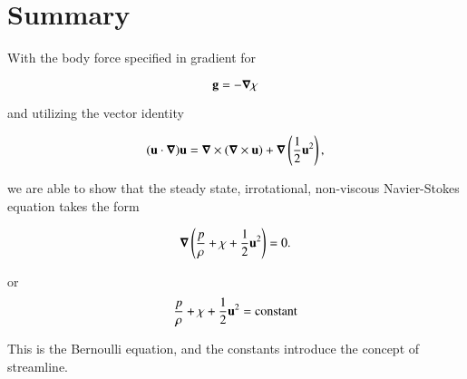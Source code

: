 \section{Summary}

With the body force specified in gradient for

\begin{equation}\label{eqn:continuumFluidsReview:2290}
\mathbf{g} = - \boldsymbol{\nabla} \chi
\end{equation}

and utilizing the vector identity

\begin{equation}\label{eqn:continuumFluidsReview:2310}
(\mathbf{u} \cdot \boldsymbol{\nabla}) \mathbf{u} = \boldsymbol{\nabla} \times (\boldsymbol{\nabla} \times \mathbf{u}) + \boldsymbol{\nabla} \left( \frac{1}{2} \mathbf{u}^2 \right),
\end{equation}

we are able to show that the steady state, irrotational, non-viscous Navier-Stokes equation takes the form

\begin{equation}\label{eqn:continuumFluidsReview:2330}
\boldsymbol{\nabla} \left( \frac{p}{\rho} + \chi + \frac{1}{2} \mathbf{u}^2 \right) = 0.
\end{equation}

or
\begin{equation}\label{eqn:continuumFluidsReview:2350}
\frac{p}{\rho} + \chi + \frac{1}{2} \mathbf{u}^2 = \text{constant}
\end{equation}

This is the Bernoulli equation, and the constants introduce the concept of streamline.  


